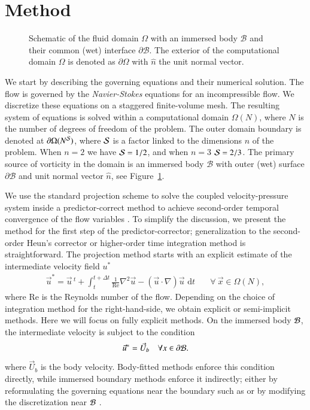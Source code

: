 \documentclass[final,1p,times]{elsarticle}
\begin{document}
\section{Method}

\begin{figure}
    \centering
    \def\svgwidth{0.5\columnwidth}
    
    \caption{Schematic of the fluid domain $\Omega$ with an immersed body $\mathcal{B}$ and their common (wet) interface $\partial\mathcal{B}$. The exterior of the computational domain $\Omega$ is denoted as $\partial\Omega$ with $\hat{n}$ the unit normal vector.}
    \label{Fig_1}
\end{figure}

We start by describing the governing equations and their numerical solution.
The flow is governed by the \emph{Navier-Stokes} equations for an incompressible flow. We discretize these equations on a staggered finite-volume mesh. The resulting system of equations is solved within a computational domain $\Omega(N)$, where $N$ is the number of degrees of freedom of the problem. The outer domain boundary is denoted at $\partial\Omega(N^{\cal S})$, where $\cal S$ is a factor linked to the dimensions $n$ of the problem. When $n=2$ we have ${\cal S}=1/2$, and when $n=3$ ${\cal S}=2/3$. The primary source of vorticity in the domain is an immersed body $\mathcal{B}$ with outer (wet) surface $\partial\mathcal{B}$ and unit normal vector $\hat n$, see Figure~\ref{Fig_1}.

We use the standard projection scheme \cite{Chorin1967} to solve the coupled velocity-pressure system inside a predictor-correct method to achieve second-order temporal convergence of the flow variables \cite{Lauber2022}. 
To simplify the discussion, we present the method for the first step of the predictor-corrector; generalization to the second-order Heun's corrector or higher-order time integration method is straightforward. The projection method starts with an explicit estimate of the intermediate velocity field $u^*$
\begin{align}\label{eq:intermediate}
    \vec{u}^* = \vec{u}\,^t + \int_{t}^{t+\Delta t}\frac{1}{\text{Re}}\nabla^2\vec{u} -\left(\vec{u}\cdot\nabla\right)\vec{u}\text{ d}t &\quad\forall\ \vec{x}\in\Omega (N),
\end{align}
where $\text{Re}$ is the Reynolds number of the flow. Depending on the choice of integration method for the right-hand-side, we obtain explicit or semi-implicit methods. Here we will focus on fully explicit methods. On the immersed body $
\cal B$, the intermediate velocity is subject to the condition
\begin{equation}
    \vec{u}^* = \vec{U}_b \quad \forall x \in \partial\cal{B}.
\end{equation} 
where $\vec{U}_b$ is the body velocity. Body-fitted methods enforce this condition directly, while immersed boundary methods enforce it indirectly; either by reformulating the governing equations near the boundary such as \cite{Peskin2010,Maertens2015} or by modifying the discretization near $\cal{B}$ \cite{Lee2015}.
\end{document}
